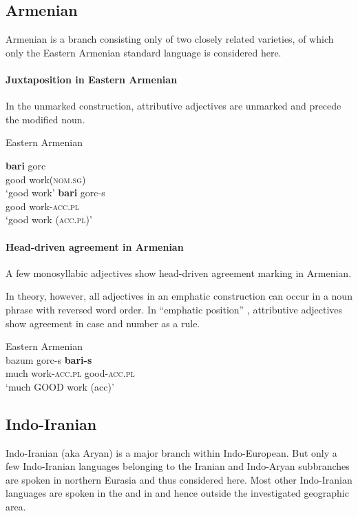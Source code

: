 \subsection{Armenian}
Armenian is a branch consisting only of two closely related varieties, of which only the Eastern Armenian standard language is considered here.

\paragraph{Juxtaposition in Eastern Armenian} 
In the unmarked construction, attributive adjectives are unmarked and precede the modified noun.
\begin{exe}
\ex \rm{Eastern Armenian \citep{ajello1998}}
\begin{xlist}
\ex 
\gll	\textbf{bari} gorc\\
	good work(\textsc{nom.sg})\\
\glt	‘good work’
\ex 
\gll	\textbf{bari} gorc-s\\
	good work-\textsc{acc.pl}\\
\glt	‘good work (\textsc{acc.pl})’
\end{xlist}
\end{exe}

\paragraph{Head-driven agreement in Armenian}
A few monosyllabic adjectives show head-driven agreement marking in Armenian. 

In theory, however, all adjectives in an emphatic construction can occur in a noun phrase with reversed word order. In “emphatic position” \cite[224]{ajello1998}, attributive adjectives show agreement in case and number as a rule.
\begin{exe}
\ex \rm{Eastern Armenian \citep[224]{ajello1998}}\\
\gll	bazum gorc-s \textbf{bari-s}\\
	much work-\textsc{acc.pl} good-\textsc{acc.pl}\\
\glt	‘much GOOD work (acc)’
\end{exe}

\subsection{Indo-Iranian}
Indo-Iranian (aka Aryan) is a major branch within Indo-European. But only a few Indo-Iranian languages belonging to the Iranian and Indo-Aryan subbranches are spoken in northern Eurasia and thus considered here. Most other Indo-Iranian languages are spoken in the  and in  and hence outside the investigated geographic area. 

